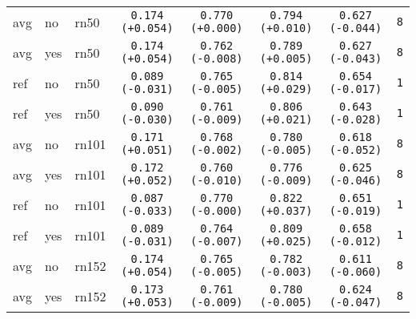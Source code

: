 \begin{tabular}{|l|l|l|c|c|c|c|c|}
avg & no & rn50 & \texttt{0.174} {\color{green}\texttt{(+0.054)}} & \texttt{0.770} {\color{black}\texttt{(+0.000)}} & \texttt{0.794} {\color{red}\texttt{(+0.010)}} & \texttt{0.627} {\color{red}\texttt{(-0.044)}} & \texttt{8}\\
avg & yes & rn50 & \texttt{0.174} {\color{green}\texttt{(+0.054)}} & \texttt{0.762} {\color{green}\texttt{(-0.008)}} & \texttt{0.789} {\color{red}\texttt{(+0.005)}} & \texttt{0.627} {\color{red}\texttt{(-0.043)}} & \texttt{8}\\
ref & no & rn50 & \texttt{0.089} {\color{red}\texttt{(-0.031)}} & \texttt{0.765} {\color{green}\texttt{(-0.005)}} & \texttt{0.814} {\color{red}\texttt{(+0.029)}} & \texttt{0.654} {\color{red}\texttt{(-0.017)}} & \texttt{1}\\
ref & yes & rn50 & \texttt{0.090} {\color{red}\texttt{(-0.030)}} & \texttt{0.761} {\color{green}\texttt{(-0.009)}} & \texttt{0.806} {\color{red}\texttt{(+0.021)}} & \texttt{0.643} {\color{red}\texttt{(-0.028)}} & \texttt{1}\\
avg & no & rn101 & \texttt{0.171} {\color{green}\texttt{(+0.051)}} & \texttt{0.768} {\color{black}\texttt{(-0.002)}} & \texttt{0.780} {\color{green}\texttt{(-0.005)}} & \texttt{0.618} {\color{red}\texttt{(-0.052)}} & \texttt{8}\\
avg & yes & rn101 & \texttt{0.172} {\color{green}\texttt{(+0.052)}} & \texttt{0.760} {\color{green}\texttt{(-0.010)}} & \texttt{0.776} {\color{green}\texttt{(-0.009)}} & \texttt{0.625} {\color{red}\texttt{(-0.046)}} & \texttt{8}\\
ref & no & rn101 & \texttt{0.087} {\color{red}\texttt{(-0.033)}} & \texttt{0.770} {\color{black}\texttt{(-0.000)}} & \texttt{0.822} {\color{red}\texttt{(+0.037)}} & \texttt{0.651} {\color{red}\texttt{(-0.019)}} & \texttt{1}\\
ref & yes & rn101 & \texttt{0.089} {\color{red}\texttt{(-0.031)}} & \texttt{0.764} {\color{green}\texttt{(-0.007)}} & \texttt{0.809} {\color{red}\texttt{(+0.025)}} & \texttt{0.658} {\color{red}\texttt{(-0.012)}} & \texttt{1}\\
avg & no & rn152 & \texttt{0.174} {\color{green}\texttt{(+0.054)}} & \texttt{0.765} {\color{green}\texttt{(-0.005)}} & \texttt{0.782} {\color{green}\texttt{(-0.003)}} & \texttt{0.611} {\color{red}\texttt{(-0.060)}} & \texttt{8}\\
avg & yes & rn152 & \texttt{0.173} {\color{green}\texttt{(+0.053)}} & \texttt{0.761} {\color{green}\texttt{(-0.009)}} & \texttt{0.780} {\color{green}\texttt{(-0.005)}} & \texttt{0.624} {\color{red}\texttt{(-0.047)}} & \texttt{8}\\

\end{tabular}
